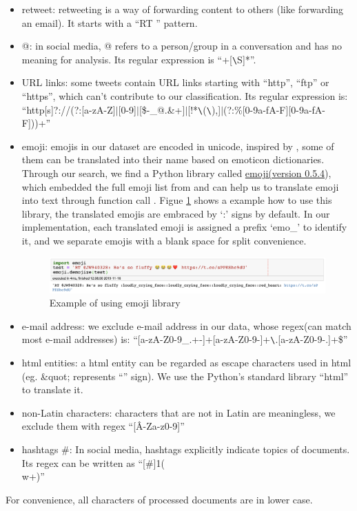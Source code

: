     \begin{itemize}
        \item retweet: retweeting is a way of forwarding content to others (like forwarding an email). It starts with a ``RT \@'' pattern. 
        \item @: in social media, @ refers to a person/group in a conversation and has no meaning for analysis. Its regular expression is ``\@+[\verb|\|S]*''. 
        \item URL links: some tweets contain URL links starting with ``http'', ``ftp'' or ``https'', which can't contribute to our classification. Its regular expression is:\\``http[s]?://(?:[a-zA-Z]$|$[0-9]$|$[\$-\_@.\&+]$|$[!*\verb|\|(\verb|\|),]$|$(?:\%[0-9a-fA-F][0-9a-fA-F]))+''
        \item emoji: emojis in our dataset are encoded in unicode, inspired by \cite{serban2019real}, some of them can be translated into their name based on emoticon dictionaries. Through our search, we find a Python library called \href{https://pypi.org/project/emoji/} {emoji(version 0.5.4}), which embedded the full emoji list from \cite{emo_list} and can help us to translate emoji into text through function call \cite{pytho_emo}. Figue \ref{fig:emo_lib} shows a example how to use this library, the translated emojis are embraced by `:' signs by default. In our implementation, each translated emoji is assigned a prefix `emo\_' to identify it, and we separate emojis with a blank space for split convenience.
        \begin{figure}[!htbp]
            \centering
            \includegraphics[width=5in]{images/emoji_lib.png}
            \caption{Example of using emoji library}
            \label{fig:emo_lib}
        \end{figure}
        \item e-mail address: we exclude e-mail address in our data, whose regex(can match most e-mail addresses) is:
        ``[a-zA-Z0-9\_.+-]+\@[a-zA-Z0-9-]+\verb|\|.[a-zA-Z0-9-.]+\$''
        \item html entities: a html entity can be regarded as escape characters used in html (eg. \&quot; represents ``'' sign). We use the Python's standard library ``html'' to translate it.
        \item non-Latin characters: characters that are not in Latin are meaningless, we exclude them with regex ``[\^A-Za-z0-9]'' 
        \item hashtags \#: In social media, hashtags explicitly indicate topics of documents. Its regex can be written as ``[\#]{1}(\\w+)''
    \end{itemize}
For convenience, all characters of processed documents are in lower case. 

